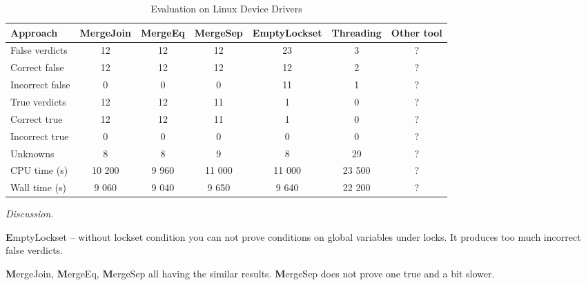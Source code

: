 \begin{center}
  \begin{table}[h]\footnotesize
    \caption{Evaluation on Linux Device Drivers}
    \begin{tabular}{ | l | c | c | c | c | c | c |}
      \hline
       Approach       & MergeJoin   & MergeEq & MergeSep & EmptyLockset & Threading & Other tool \\ \hline
      False verdicts & 12      & 12          & 12        & 23         & 3 & ?\\ 
  \hspace{0.5cm} Correct false   & 12 & 12   & 12        & 12         & 2 & ? \\ 
  \hspace{0.5cm} Incorrect false & 0 & 0   & 0        & 11         & 1 & ? \\ \hline
      True verdicts  & 12      & 12          & 11        & 1         & 0 & ? \\ 
  \hspace{0.5cm} Correct true   & 12 & 12    & 11        & 1         & 0 & ? \\ 
  \hspace{0.5cm} Incorrect true & 0 & 0    & 0        & 0         & 0 & ? \\ \hline
      Unknowns       & 8      & 8          & 9        & 8         & 29 & ? \\ \hline
      CPU time (s)   & 10 200 & 9 960      & 11 000   & 11 000    & 23 500 & ? \\
      Wall time (s)  & 9 060  & 9 040      & 9 650    & 9 640     & 22 200 & ? \\
      \hline
    \end{tabular}
  \end{table}
\end{center}

{\em Discussion.}

{\textbf EmptyLockset} -- without lockset condition you can not prove conditions on global variables under locks. It produces too much incorrect false verdicts.

{\textbf MergeJoin}, {\textbf MergeEq}, {\textbf MergeSep} all having the similar results. {\textbf MergeSep} does not prove one true and a bit slower.

